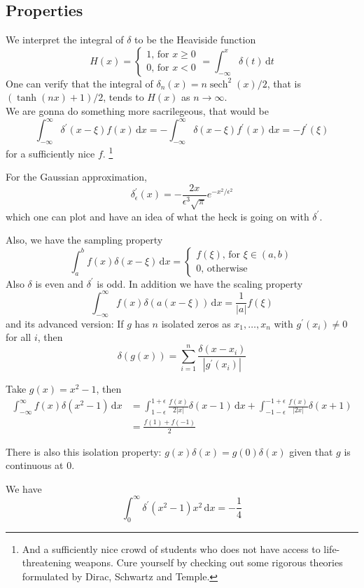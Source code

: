\subsection{Properties}
We interpret the integral of $\delta$ to be the Heaviside function
$$H(x)=\begin{cases}
    1\text{, for $x\ge 0$}\\
    0\text{, for $x<0$}
\end{cases}=\int_{-\infty}^x\delta(t)\,\mathrm dt$$
One can verify that the integral of $\delta_n(x)=n\operatorname{sech}^2(x)/2$, that is $(\tanh(nx)+1)/2$, tends to $H(x)$ as $n\to\infty$.\\
We are gonna do something more sacrilegeous, that would be
$$\int_{-\infty}^\infty\delta^\prime(x-\xi)f(x)\,\mathrm dx=-\int_{-\infty}^\infty\delta(x-\xi)f^\prime(x)\,\mathrm dx=-f^\prime(\xi)$$
for a sufficiently nice $f$.
\footnote{And a sufficiently nice crowd of students who does not have access to life-threatening weapons. Cure yourself by checking out some rigorous theories formulated by Dirac, Schwartz and Temple.}
\begin{example}
    For the Gaussian approximation,
    $$\delta_\epsilon^\prime(x)=-\frac{2x}{\epsilon^3\sqrt{\pi}}e^{-x^2/\epsilon^2}$$
    which one can plot and have an idea of what the heck is going on with $\delta^\prime$.
\end{example}
Also, we have the sampling property
$$\int_a^bf(x)\delta(x-\xi)\,\mathrm dx=\begin{cases}
    f(\xi)\text{, for $\xi\in(a,b)$}\\
    0\text{, otherwise}
\end{cases}$$
Also $\delta$ is even and $\delta^\prime$ is odd.
In addition we have the scaling property
$$\int_{-\infty}^\infty f(x)\delta(a(x-\xi))\,\mathrm dx=\frac{1}{|a|}f(\xi)$$
and its advanced version:
If $g$ has $n$ isolated zeros as $x_1,\ldots,x_n$ with $g^\prime(x_i)\neq 0$ for all $i$, then
$$\delta(g(x))=\sum_{i=1}^n\frac{\delta(x-x_i)}{|g^\prime(x_i)|}$$
\begin{example}
    Take $g(x)=x^2-1$, then
    \begin{align*}
        \int_{-\infty}^\infty f(x)\delta(x^2-1)\,\mathrm dx&=\int_{1-\epsilon}^{1+\epsilon}\frac{f(x)}{2|x|}\delta(x-1)\,\mathrm dx+\int_{-1-\epsilon}^{-1+\epsilon}\frac{f(x)}{|2x|}\delta(x+1)\\
        &=\frac{f(1)+f(-1)}{2}
    \end{align*}
\end{example}
There is also this isolation property: $g(x)\delta(x)=g(0)\delta(x)$ given that $g$ is continuous at $0$.
\begin{example}
    We have
    $$\int_0^\infty\delta^\prime(x^2-1)x^2\,\mathrm dx=-\frac{1}{4}$$
\end{example}
